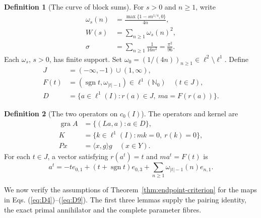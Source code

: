 \documentclass[11pt]{article}
\newcommand{\Nzero}{\mathbb N_0}
\newcommand{\gra}{\operatorname{gra}}
\newcommand{\sgn}{\operatorname{sgn}}
\newcommand{\pair}[2]{\langle #1,#2\rangle}
\theoremstyle{definition}
\newtheorem{definition}{Definition}
\theoremstyle{remark}
\begin{document}
\begin{definition}[The curve of block sums]
For $s>0$ and $n\ge1$, write
\begin{equation}
\begin{aligned}
\omega_s(n)&=\frac{\max\{1-sn^{1/4},0\}}{4n},\\
W(s)&=\sum_{n\ge1}\omega_s(n)^2,\\
\sigma&=\sum_{n\ge1}\frac1{16n^2}=\frac{\pi^2}{96}.
\end{aligned}
\label{eq:D6}
\end{equation}
Each $\omega_s$, $s>0$, has finite support. Set $\omega_0=(1/(4n))_{n\ge1}\in\ell^2\setminus\ell^1$. Define
\begin{equation}
\begin{aligned}
J&=(-\infty,-1)\cup(1,\infty),\\
F(t)&=(\sgn t,\omega_{|t|-1})\in\ell^1(\Nzero)\quad(t\in J),\\
D&=\{a\in\ell^1(I):r(a)\in J,\ ma=F(r(a))\}.
\end{aligned}
\label{eq:D7}
\end{equation}

\end{definition}

\begin{definition}[The two operators on $c_0(I)$]
The operators and kernel are
\begin{equation}
\begin{aligned}
\gra A&=\{(La,a):a\in D\},\\
K&=\{k\in\ell^1(I):mk=0,\ r(k)=0\},\\
Px&=\pair{x}{g}g\quad(x\in Y).
\end{aligned}
\label{eq:D8}
\end{equation}
For each $t\in J$, a vector satisfying $r(a^t)=t$ and $ma^t=F(t)$ is
\begin{equation}
a^t=-t e_{0,1}+(t+\sgn t)e_{0,3}
       +\sum_{n\ge1}\omega_{|t|-1}(n)e_{n,1}.
\label{eq:D9}
\end{equation}
\end{definition}

\label{sec:supporting}
We now verify the assumptions of Theorem~\ref{thm:endpoint-criterion} for the maps in Eqs. (\ref{eq:D4})--(\ref{eq:D9}). The first three lemmas supply the pairing identity, the exact primal annihilator and the complete parameter fibres.
\end{document}
